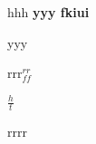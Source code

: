 \documentclass{article}
\begin{document}
\begin{flushright}
	hhh %
\textbf{yyy%
fkiui}
\end{flushright}

yyy

rrr$_{ff}^{rr}
$

$\frac{h}{t}$

rrrr\\


\begin{center}

\end{center}
\end{document}
